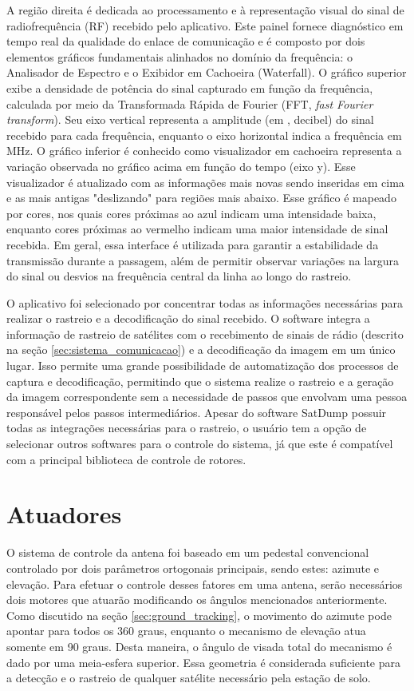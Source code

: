 A região direita é dedicada ao processamento e à representação visual do sinal de radiofrequência (RF) recebido pelo aplicativo. Este painel fornece diagnóstico em tempo real da qualidade do enlace de comunicação e é composto por dois elementos gráficos fundamentais alinhados no domínio da frequência: o Analisador de Espectro e o Exibidor em Cachoeira (Waterfall).
O gráfico superior exibe a densidade de potência do sinal capturado em função da frequência, calculada por meio da Transformada Rápida de Fourier (FFT, \textit{fast Fourier transform}). Seu eixo vertical representa a amplitude (em , decibel) do sinal recebido para cada frequência, enquanto o eixo horizontal indica a frequência em $\text{MHz}$.
O gráfico inferior é conhecido como visualizador em cachoeira representa a variação observada no gráfico acima em função do tempo (eixo y). Esse visualizador é atualizado com as informações mais novas sendo inseridas em cima e as mais antigas "deslizando" para regiões mais abaixo. Esse gráfico é mapeado por cores, nos quais cores próximas ao azul indicam uma intensidade baixa, enquanto cores próximas ao vermelho indicam uma maior intensidade de sinal recebida.
Em geral, essa interface é utilizada para garantir a estabilidade da transmissão durante a passagem, além de permitir observar variações na largura do sinal ou desvios na frequência central da linha ao longo do rastreio.

O aplicativo foi selecionado por concentrar todas as informações necessárias para realizar o rastreio e a decodificação do sinal recebido.
O software integra a informação de rastreio de satélites com o recebimento de sinais de rádio (descrito na seção \ref{sec:sistema_comunicacao}) e a decodificação da imagem em um único lugar.
Isso permite uma grande possibilidade de automatização dos processos de captura e decodificação, permitindo que o sistema realize o rastreio e a geração da imagem correspondente sem a necessidade de passos que envolvam uma pessoa responsável pelos passos intermediários.
Apesar do software SatDump possuir todas as integrações necessárias para o rastreio, o usuário tem a opção de selecionar outros softwares para o controle do sistema, já que este é compatível com a principal biblioteca de controle de rotores.

\section{Atuadores}\label{sec:motor_passo}
O sistema de controle da antena foi baseado em um pedestal convencional controlado por dois parâmetros ortogonais principais, sendo estes: azimute e elevação.
Para efetuar o controle desses fatores em uma antena, serão necessários dois motores que atuarão modificando
os ângulos mencionados anteriormente. Como discutido na seção \ref{sec:ground_tracking}, o movimento do azimute pode apontar para todos os 360 graus, enquanto o
mecanismo de elevação atua somente em 90 graus. Desta maneira, o ângulo de visada total do mecanismo
é dado por uma meia-esfera superior. Essa geometria é considerada suficiente para a detecção e o rastreio de qualquer satélite necessário pela estação de solo.

